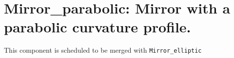 \section{Mirror\_parabolic: Mirror with a parabolic curvature profile.}


This component is scheduled to be merged with \texttt{Mirror\_elliptic}
